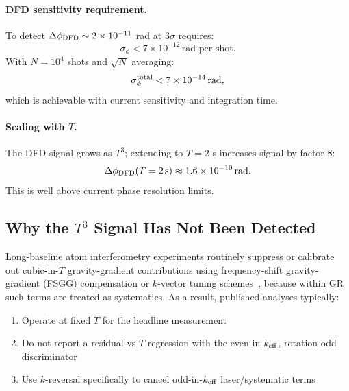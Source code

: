 \paragraph{DFD sensitivity requirement.}
To detect $\Delta\phi_{\rm DFD} \sim 2 \times 10^{-11}$ rad at $3\sigma$ requires:
\begin{equation}
\sigma_\phi < 7 \times 10^{-12}\,\text{rad per shot}.
\end{equation}
With $N = 10^4$ shots and $\sqrt{N}$ averaging:
\begin{equation}
\sigma_\phi^{\rm total} < 7 \times 10^{-14}\,\text{rad},
\end{equation}
which is achievable with current sensitivity and integration time.

\paragraph{Scaling with $T$.}
The DFD signal grows as $T^3$; extending to $T = 2$ s increases signal by factor 8:
\begin{equation}
\Delta\phi_{\rm DFD}(T=2\,\text{s}) \approx 1.6 \times 10^{-10}\,\text{rad}.
\end{equation}
This is well above current phase resolution limits.

\subsection{Why the $T^3$ Signal Has Not Been Detected}\label{sec:mw-why-not-seen}

Long-baseline atom interferometry experiments routinely suppress or calibrate out 
cubic-in-$T$ gravity-gradient contributions using frequency-shift gravity-gradient 
(FSGG) compensation or $k$-vector tuning schemes~\cite{DAmico2017,Overstreet2018,Roura2017}, 
because within GR such terms are treated as systematics. As a result, published analyses typically:
\begin{enumerate}
\item Operate at fixed $T$ for the headline measurement
\item Do not report a residual-vs-$T$ regression with the even-in-$k_{\rm eff}$, rotation-odd discriminator
\item Use $k$-reversal specifically to cancel odd-in-$k_{\rm eff}$ laser/systematic terms
\end{enumerate}


